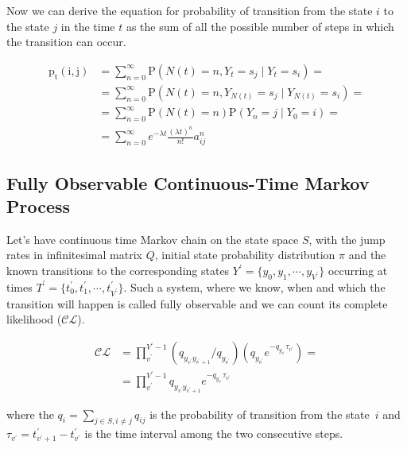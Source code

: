 \documentclass[thesis=M,english]{FITthesis}[2012/10/20]
\begin{document}
Now we can derive the equation for probability of transition from the state $i$ to the state $j$ in the time $t$ as the sum of all the possible number of steps in which the transition can occur. 

\begin{equation}
\begin{aligned}
\mathrm{p_t(i,j)} &= \sum_{n=0}^{\infty} \mathrm{P}( N(t) = n, Y_t = s_j \mid Y_t = s_i )  = \\
                  &= \sum_{n=0}^{\infty} \mathrm{P}( N(t) = n, Y_{N(t)} = s_j \mid Y_{N(t)} = s_i )  = \\
                  &= \sum_{n=0}^{\infty} \mathrm{P}( N(t) = n ) \mathrm{P}( Y_n = j \mid Y_0 = i )  = \\
				  &= \sum_{n=0}^{\infty} e^{-\lambda t} \frac{ (\lambda t)^n}{n!} a_{ij}^n  
\end{aligned}
\end{equation} 



\subsection{ Fully Observable Continuous-Time Markov Process }

Let's have continuous time Markov chain on the state space $S$, with the jump rates in infinitesimal matrix $Q$, initial state probability distribution $\pi$ and the known transitions to the corresponding states $Y^{'}= \{y_0, y_1, \cdots, y_{V^{'}} \} $ occurring at times $T^{'} = \{ t_0^{'}, t_1^{'}, \cdots, t_{V^{'}}^{'} \}$. Such a system, where we know, when and which the transition will happen is called fully observable and we can count its complete likelihood ($\mathcal{CL}$). 

\begin{equation}\label{eq:CL1}
\begin{aligned}  
 \mathcal{CL} &=  \prod_{v^{'}}^{V^{'}-1} ( q_{y_{v^{'}} y_{v^{'}+1}} / q_{y_{v^{'}}} )( q_{y_{v^{'}}} e^{ - q_{y_{v^{'}}} \tau_{v^{'}} }) = \\
    &= \prod_{v^{'}}^{V^{'}-1} q_{y_{v^{'}} y_{v^{'}+1}} e^{ - q_{y_{v^{'}}} \tau_{v^{'}} }
\end{aligned}
\end{equation}

where the $q_i = \sum_{j\in S, i\neq j} q_{ij}$ is the probability of transition from the state~$i$ and   
$\tau_{v^{'}} = t_{v^{'}+1}^{'} - t_{v^{'}}^{'}$ is the time interval among the two consecutive steps.
\end{document}
